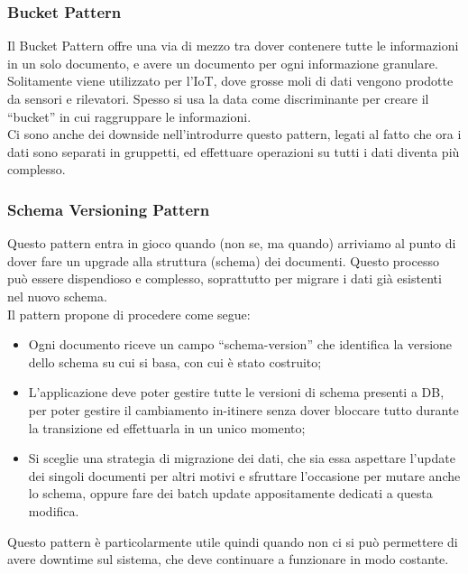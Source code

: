 \subsubsection{Bucket Pattern}
Il Bucket Pattern offre una via di mezzo tra dover contenere tutte le informazioni in un solo documento, e avere un documento per ogni informazione granulare.\\
Solitamente viene utilizzato per l'IoT, dove grosse moli di dati vengono prodotte da sensori e rilevatori. Spesso si usa la data come discriminante per creare il ``bucket'' in cui raggruppare le informazioni.\\
Ci sono anche dei downside nell'introdurre questo pattern, legati al fatto che ora i dati sono separati in gruppetti, ed effettuare operazioni su tutti i dati diventa più complesso.\\

\subsubsection{Schema Versioning Pattern}
Questo pattern entra in gioco quando (non se, ma quando) arriviamo al punto di dover fare un upgrade alla struttura (schema) dei documenti. Questo processo può essere dispendioso e complesso, soprattutto per migrare i dati già esistenti nel nuovo schema.\\
Il pattern propone di procedere come segue:
\begin{itemize}
    \item Ogni documento riceve un campo ``schema-version'' che identifica la versione dello schema su cui si basa, con cui è stato costruito;
    \item L'applicazione deve poter gestire tutte le versioni di schema presenti a DB, per poter gestire il cambiamento in-itinere senza dover bloccare tutto durante la transizione ed effettuarla in un unico momento;
    \item Si sceglie una strategia di migrazione dei dati, che sia essa aspettare l'update dei singoli documenti per altri motivi e sfruttare l'occasione per mutare anche lo schema, oppure fare dei batch update appositamente dedicati a questa modifica.
\end{itemize}
\noindent Questo pattern è particolarmente utile quindi quando non ci si può permettere di avere downtime sul sistema, che deve continuare a funzionare in modo costante.\\

